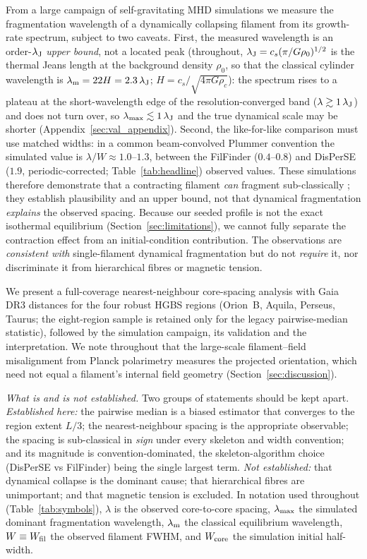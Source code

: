 \documentclass[usenatbib,twoside,twocolumn]{mnras}
\begin{document}
From a large campaign of self-gravitating MHD simulations we measure the fragmentation wavelength of a dynamically collapsing filament from its growth-rate spectrum, subject to two caveats. First, the measured wavelength is an order-$\lambda_{\rm J}$ \emph{upper bound}, not a located peak (throughout, $\lambda_{\rm J}=c_s(\pi/G\rho_0)^{1/2}$ is the thermal Jeans length at the background density $\rho_0$, so that the classical cylinder wavelength is $\lambda_{\rm m}=22H=2.3\,\lambda_{\rm J}$; $H=c_s/\sqrt{4\pi G\rho_c}$): the spectrum rises to a plateau at the short-wavelength edge of the resolution-converged band ($\lambda\gtrsim1\,\lambda_{\rm J}$) and does not turn over, so $\lambda_{\rm max}\lesssim1\,\lambda_{\rm J}$ and the true dynamical scale may be shorter (Appendix~\ref{sec:val_appendix}). Second, the like-for-like comparison must use matched widths: in a common beam-convolved Plummer convention the simulated value is $\lambda/W\approx1.0$--$1.3$, between the FilFinder ($0.4$--$0.8$) and DisPerSE ($1.9$, periodic-corrected; Table~\ref{tab:headline}) observed values. These simulations therefore demonstrate that a contracting filament \emph{can} fragment sub-classically \citep{Clarke2016,Clarke2017}; they establish plausibility and an upper bound, not that dynamical fragmentation \emph{explains} the observed spacing. Because our seeded profile is not the exact isothermal equilibrium (Section~\ref{sec:limitations}), we cannot fully separate the contraction effect from an initial-condition contribution. The observations are \emph{consistent with} single-filament dynamical fragmentation but do not \emph{require} it, nor discriminate it from hierarchical fibres or magnetic tension.

We present a full-coverage nearest-neighbour core-spacing analysis with Gaia DR3 distances \citep{Zhang2023} for the four robust HGBS regions (Orion~B, Aquila, Perseus, Taurus; the eight-region sample is retained only for the legacy pairwise-median statistic), followed by the simulation campaign, its validation and the interpretation. We note throughout that the large-scale filament--field misalignment from Planck polarimetry \citep{Planck2016} measures the projected orientation, which need not equal a filament's internal field geometry (Section~\ref{sec:discussion}).

\smallskip\noindent\emph{What is and is not established.} Two groups of statements should be kept apart. \emph{Established here:} the pairwise median is a biased estimator that converges to the region extent $L/3$; the nearest-neighbour spacing is the appropriate observable; the spacing is sub-classical in \emph{sign} under every skeleton and width convention; and its magnitude is convention-dominated, the skeleton-algorithm choice (DisPerSE vs FilFinder) being the single largest term. \emph{Not established:} that dynamical collapse is the dominant cause; that hierarchical fibres are unimportant; and that magnetic tension is excluded. In notation used throughout (Table~\ref{tab:symbols}), $\lambda$ is the observed core-to-core spacing, $\lambda_{\rm max}$ the simulated dominant fragmentation wavelength, $\lambda_{\rm m}$ the classical equilibrium wavelength, $W\equiv W_{\rm fil}$ the observed filament FWHM, and $W_{\rm core}$ the simulation initial half-width.
\end{document}

